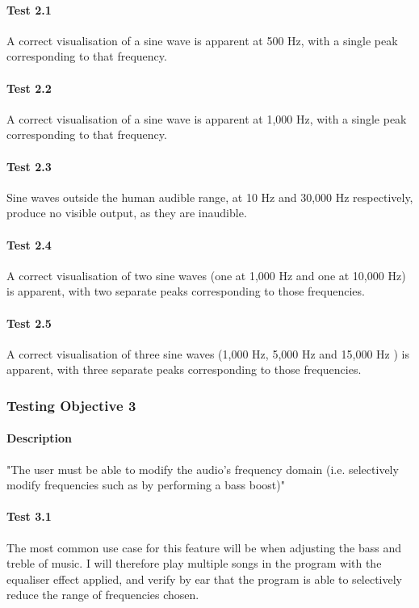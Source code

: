 \begin{multicols}{2}
\paragraph{Test 2.1} A correct visualisation of a sine wave is apparent at 500 Hz, with a single peak corresponding to that frequency.
\paragraph{Test 2.2} A correct visualisation of a sine wave is apparent at 1,000 Hz, with a single peak corresponding to that frequency.
\paragraph{Test 2.3} Sine waves outside the human audible range, at 10 Hz and 30,000 Hz respectively, produce no visible output, as they are inaudible.
\paragraph{Test 2.4} A correct visualisation of two sine waves (one at 1,000 Hz and one at 10,000 Hz) is apparent, with two separate peaks corresponding to those frequencies.
\paragraph{Test 2.5} A correct visualisation of three sine waves (1,000 Hz, 5,000 Hz and 15,000 Hz ) is apparent, with three separate peaks corresponding to those frequencies.
\end{multicols}

\pagebreak
\subsubsection{Testing Objective 3}
\paragraph{Description} "The user must be able to modify the audio's frequency domain (i.e. selectively modify frequencies such as by performing a bass boost)"

\paragraph{Test 3.1}
The most common use case for this feature will be when adjusting the bass and treble of music. I will therefore play multiple songs in the program with the equaliser effect applied, and verify by ear that the program is able to selectively reduce the range of frequencies chosen.

